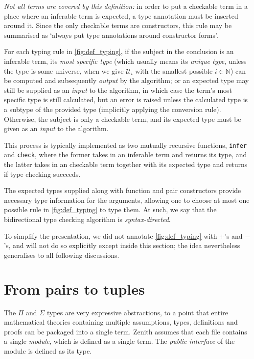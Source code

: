 \documentclass[twoside]{report}
\begin{document}
\emph{Not all terms are covered by this definition:} in order to put a checkable term in a place where an inferable term is expected, a type annotation must be inserted around it. Since the only checkable terms are constructors, this rule may be summarised as `always put type annotations around constructor forms'.

For each typing rule in \cref{fig:def_typing}, if the subject in the conclusion is an inferable term, its \emph{most specific type} (which usually means its \emph{unique type}, unless the type is some universe, when we give $\mathcal U_i$ with the smallest possible $i\in\mathbb N$) can be computed and subsequently \emph{output} by the algorithm; or an expected type may still be supplied as an \emph{input} to the algorithm, in which case the term's most specific type is still calculated, but an error is raised unless the calculated type is a subtype of the provided type (implicitly applying the conversion rule). Otherwise, the subject is only a checkable term, and its expected type must be given as an \emph{input} to the algorithm.

This process is typically implemented as two mutually recursive functions, \texttt{infer} and \texttt{check}, where the former takes in an inferable term and returns its type, and the latter takes in an checkable term together with its expected type and returns if type checking succeeds.

The expected types supplied along with function and pair constructors provide necessary type information for the arguments, allowing one to choose at most one possible rule in \cref{fig:def_typing} to type them. At such, we say that the bidirectional type checking algorithm is \emph{syntax-directed}.

To simplify the presentation, we did not annotate \cref{fig:def_typing} with $+$'s and $-$'s, and will not do so explicitly except inside this section; the idea nevertheless generalises to all following discussions.

\section{From pairs to tuples}
\label{sec:from_pairs_to_tuples}

The $\Pi$ and $\Sigma$ types are very expressive abstractions, to a point that entire mathematical theories containing multiple assumptions, types, definitions and proofs can be packaged into a single term. Zenith assumes that each file contains a single \emph{module}, which is defined as a single term. The \emph{public interface} of the module is defined as its type.
\end{document}
